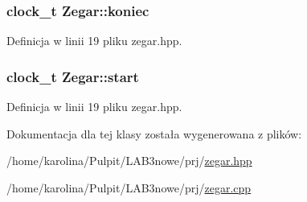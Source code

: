 \hypertarget{class_zegar_ae74d610e2ffed2f50f16349e21cc2ef8}{
\subsubsection[{koniec}]{\setlength{\rightskip}{0pt plus 5cm}clock\-\_\-t Zegar\-::koniec\hspace{0.3cm}{\ttfamily [private]}}}\label{class_zegar_ae74d610e2ffed2f50f16349e21cc2ef8}


Definicja w linii 19 pliku zegar.\-hpp.

\hypertarget{class_zegar_a7486e73fa453ccef2a597b2b7c9d0d20}{
\subsubsection[{start}]{\setlength{\rightskip}{0pt plus 5cm}clock\-\_\-t Zegar\-::start\hspace{0.3cm}{\ttfamily [private]}}}\label{class_zegar_a7486e73fa453ccef2a597b2b7c9d0d20}


Definicja w linii 19 pliku zegar.\-hpp.



Dokumentacja dla tej klasy została wygenerowana z plików\-:\begin{DoxyCompactItemize}
\item 
/home/karolina/\-Pulpit/\-L\-A\-B3nowe/prj/\hyperlink{zegar_8hpp}{zegar.\-hpp}\item 
/home/karolina/\-Pulpit/\-L\-A\-B3nowe/prj/\hyperlink{zegar_8cpp}{zegar.\-cpp}\end{DoxyCompactItemize}
